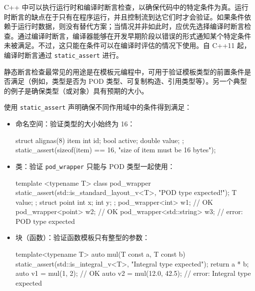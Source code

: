 
C++ 中可以执行运行时和编译时断言检查，以确保代码中的特定条件为真。运行时断言的缺点在于只有在程序运行，并且控制流到达它们时才会验证。如果条件依赖于运行时数据，则没有替代方案；当情况并非如此时，应优先选择编译时断言检查。通过编译时断言，编译器能够在开发早期阶段以错误的形式通知某个特定条件未被满足。不过，这只能在条件可以在编译时评估的情况下使用。自 C++11 起，编译时断言通过 \verb|static_assert| 进行。



静态断言检查最常见的用途是在模板元编程中，可用于验证模板类型的前置条件是否满足（例如，类型是否为 POD 类型、可复制构造、引用类型等）。另一个典型的例子是确保类型（或对象）具有预期的大小。


使用 \verb|static_assert| 声明确保不同作用域中的条件得到满足：

\begin{itemize}
\item
命名空间：验证类型的大小始终为 16：

\begin{cpp}
struct alignas(8) item
{
    int      id;
    bool     active;
    double   value;
};
static_assert(sizeof(item) == 16, "size of item must be 16 bytes");
\end{cpp}

\item
类：验证 \verb|pod_wrapper| 只能与 POD 类型一起使用：

\begin{cpp}
template <typename T>
class pod_wrapper
{
    static_assert(std::is_standard_layout_v<T>, "POD type expected!");
    T value;
};
struct point
{
    int x;
    int y;
};
pod_wrapper<int>         w1; // OK
pod_wrapper<point>       w2; // OK
pod_wrapper<std::string> w3; // error: POD type expected
\end{cpp}

\item
块（函数）：验证函数模板只有整型的参数：

\begin{cpp}
template<typename T>
auto mul(T const a, T const b)
{
    static_assert(std::is_integral_v<T>, "Integral type expected");
    return a * b;
}
auto v1 = mul(1, 2);       // OK
auto v2 = mul(12.0, 42.5); // error: Integral type expected
\end{cpp}
\end{itemize}


